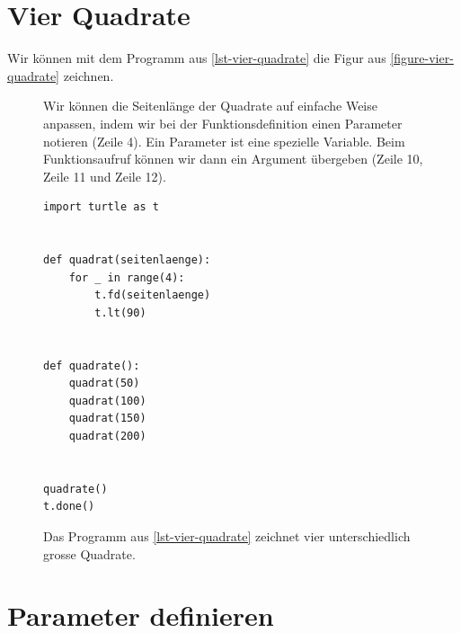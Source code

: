 \section{Vier Quadrate \Ninja[][white]}

Wir können mit dem Programm aus \autoref{lst-vier-quadrate} die Figur aus \autoref{figure-vier-quadrate} zeichnen.

\vspace{-0.25cm}

\begin{figure}[H]
\centering
\begin{minipage}[c][4cm]{0.5\linewidth}
\centering
{}
\caption{Das Programm aus \autoref{lst-vier-quadrate} zeichnet vier unterschiedlich grosse Quadrate.}
\label{figure-vier-quadrate}
\begin{justify}
Wir können die Seitenlänge der Quadrate auf einfache Weise anpassen, indem wir bei der Funktionsdefinition einen Parameter notieren (Zeile 4). Ein Parameter ist eine spezielle Variable. Beim Funktionsaufruf können wir dann ein Argument übergeben (Zeile 10, Zeile 11 und Zeile 12).
\end{justify}
\end{minipage}
\hfill
\begin{minipage}[c]{0.45\linewidth}
\centering
\begin{lstlisting}[language={python3}, caption={\graybgtexttt{vier\_quadrate.py}}, label={lst-vier-quadrate}]
import turtle as t


def quadrat(seitenlaenge):
	for _ in range(4):
		t.fd(seitenlaenge)
		t.lt(90)


def quadrate():
	quadrat(50)
	quadrat(100)
	quadrat(150)
	quadrat(200)


quadrate()
t.done()

\end{lstlisting}
\end{minipage}
\end{figure}

\section{Parameter definieren}


